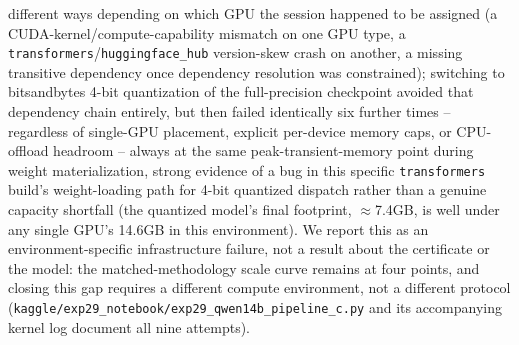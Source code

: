 \documentclass[onecolumn]{jmlr}
\begin{document}
\begin{enumerate}[leftmargin=*, topsep=2pt, itemsep=2pt]
  different ways depending on which GPU the session happened to be
  assigned (a CUDA-kernel/compute-capability mismatch on one GPU type,
  a \texttt{transformers}/\texttt{huggingface\_hub} version-skew crash
  on another, a missing transitive dependency once dependency
  resolution was constrained); switching to bitsandbytes 4-bit
  quantization of the full-precision checkpoint avoided that dependency
  chain entirely, but then failed identically six further times --
  regardless of single-GPU placement, explicit per-device memory caps,
  or CPU-offload headroom -- always at the same peak-transient-memory
  point during weight materialization, strong evidence of a bug in this
  specific \texttt{transformers} build's weight-loading path for 4-bit
  quantized dispatch rather than a genuine capacity shortfall (the
  quantized model's final footprint, $\approx$7.4GB, is well under any
  single GPU's 14.6GB in this environment). We report this as an
  environment-specific infrastructure failure, not a result about the
  certificate or the model: the matched-methodology scale curve remains
  at four points, and closing this gap requires a different compute
  environment, not a different protocol
  (\texttt{kaggle/\allowbreak exp29\_\allowbreak notebook/\allowbreak exp29\_\allowbreak qwen14b\_\allowbreak pipeline\_\allowbreak c.py} and
  its accompanying kernel log document all nine attempts).


\end{enumerate}
\end{document}
